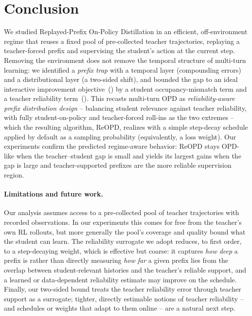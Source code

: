 \section{Conclusion}

We studied Replayed-Prefix On-Policy Distillation in an efficient, off-environment regime
that reuses a fixed pool of pre-collected teacher trajectories, replaying a
teacher-forced prefix and supervising the student's action at the current step.
Removing the environment does not remove the temporal structure of multi-turn learning:
we identified a \emph{prefix trap} with a temporal layer (compounding errors) and a
distributional layer (a two-sided shift), and bounded the gap to an ideal interactive
improvement objective~() by a student occupancy-mismatch term and a
teacher reliability term~(). This recasts multi-turn OPD as \emph{reliability-aware prefix distribution design}
-- balancing student relevance against teacher reliability, with fully
student-on-policy and teacher-forced roll-ins as the two extremes -- which the
resulting algorithm, ReOPD, realizes with a simple step-decay schedule applied by
default as a sampling probability (equivalently, a loss weight). Our experiments confirm the predicted
regime-aware behavior: ReOPD stays OPD-like when the teacher--student gap is small and
yields its largest gains when the gap is large and teacher-supported prefixes are the
more reliable supervision region.

\paragraph{Limitations and future work.}
Our analysis assumes access to a pre-collected pool of teacher trajectories with
recorded observations. In our experiments this comes for free from the teacher's
own RL rollouts, but more generally the pool's coverage and quality bound what the
student can learn. The reliability surrogate we adopt reduces, to first order, to a
step-decaying weight, which is effective but coarse: it captures \emph{how deep} a
prefix is rather than directly measuring \emph{how far} a given prefix lies from the
overlap between student-relevant histories and the teacher's reliable support, and a
learned or data-dependent reliability estimate may improve on the schedule. Finally,
our two-sided bound treats the teacher reliability error through teacher support as a
surrogate; tighter, directly estimable notions of teacher reliability -- and schedules
or weights that adapt to them online -- are a natural next step.
